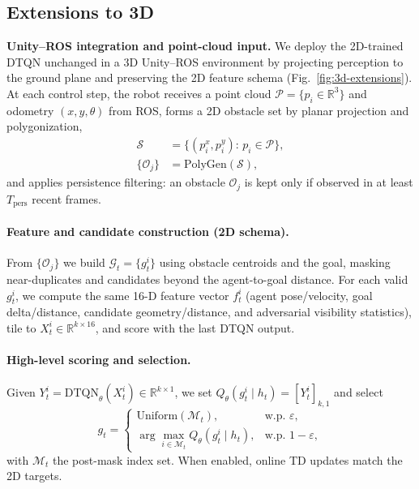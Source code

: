 \documentclass[letterpaper, 10 pt, conference]{ieeeconf}
\begin{document}
\subsection{Extensions to 3D}
\textbf{Unity--ROS integration and point-cloud input.}
We deploy the 2D-trained DTQN unchanged in a 3D Unity--ROS environment by projecting perception to the ground plane and preserving the 2D feature schema (Fig.~\ref{fig:3d-extensions}). At each control step, the robot receives a point cloud $\mathcal{P}=\{p_i \in \mathbb{R}^3\}$ and odometry $(x,y,\theta)$ from ROS, forms a 2D obstacle set by planar projection and polygonization,
\begin{align}
\mathcal{S} &= \{(p_i^x,p_i^y):\, p_i\in\mathcal{P}\}, \\
\{\mathcal{O}_j\} &= \mathrm{PolyGen}(\mathcal{S}),
\end{align}
and applies persistence filtering: an obstacle $\mathcal{O}_j$ is kept only if observed in at least $T_{\mathrm{pers}}$ recent frames.

\paragraph{Feature and candidate construction (2D schema).}
From $\{\mathcal{O}_j\}$ we build $\mathcal{G}_t=\{g_t^i\}$ using obstacle centroids and the goal, masking near-duplicates and candidates beyond the agent-to-goal distance. For each valid $g_t^i$, we compute the same 16-D feature vector $f_t^i$ (agent pose/velocity, goal delta/distance, candidate geometry/distance, and adversarial visibility statistics), tile to $X_t^i\in\mathbb{R}^{k\times 16}$, and score with the last DTQN output.

\paragraph{High-level scoring and selection.}
Given $Y_t^i=\mathrm{DTQN}_\theta(X_t^i)\in\mathbb{R}^{k\times 1}$, we set $Q_\theta(g_t^i\!\mid h_t)=[Y_t^i]_{k,1}$ and select
\begin{equation}
g_t =
\begin{cases}
\mathrm{Uniform}(\mathcal{M}_t), & \text{w.p. }\varepsilon,\\
\arg\max_{i\in\mathcal{M}_t} Q_\theta(g_t^i\!\mid h_t), & \text{w.p. }1-\varepsilon,
\end{cases}
\end{equation}
with $\mathcal{M}_t$ the post-mask index set. When enabled, online TD updates match the 2D targets.
\end{document}
